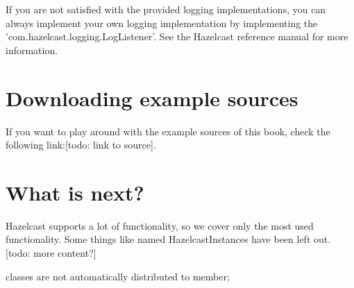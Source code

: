 If you are not satisfied with the provided logging implementations, you can always implement your own logging implementation by implementing the 'com.hazelcast.logging.LogListener'. See the Hazelcast reference manual for more information.

\section{Downloading example sources}
If you want to play around with the example sources of this book, check the following link:[todo: link to source]. 

\section{What is next?}
Hazelcast supports a lot of functionality, so we cover only the most used functionality. Some things like named HazelcastInstances have been left out. [todo: more content?]

classes are not automatically distributed to member; 